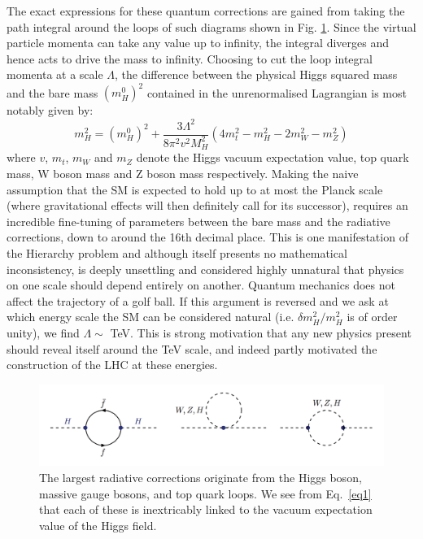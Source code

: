 \documentclass[a4paper]{jpconf}
\begin{document}
\hfill\break
\noindent The exact expressions for these quantum corrections are gained from taking the path integral around the loops of such diagrams shown in Fig. \ref{fig:feyn}. Since the virtual particle momenta can take any value up to infinity, the integral diverges and hence acts to drive the mass to infinity. Choosing to cut the loop integral momenta at a scale \(\Lambda\), the difference between the physical Higgs squared mass and the bare mass \(\left(m_{H}^0\right)^2\) contained in the unrenormalised Lagrangian is most notably given by\cite{djouadi}:
\begin{equation}
\label{eq1}
m_H^2 = \left(m_{H}^0\right)^2  + \frac{3\Lambda^2}{8\pi^2 v^2 M_H^2}\left(4m_t^2 - m_H^2 - 2m_W^2 - m_Z^2\right)
\end{equation}
where \(v\), \(m_t\), \(m_W\) and \(m_Z\) denote the Higgs vacuum expectation value, top quark mass, W boson mass and Z boson mass respectively. Making the naive assumption that the SM is expected to hold up to at most the Planck scale (where gravitational effects will then definitely call for its successor), requires an incredible fine-tuning of parameters between the bare mass and the radiative corrections, down to around the 16th decimal place. This is one manifestation of the Hierarchy problem and although itself presents no mathematical inconsistency, is deeply unsettling and considered highly unnatural that physics on one scale should depend entirely on another. Quantum mechanics does not affect the trajectory of a golf ball. If this argument is reversed and we ask at which energy scale the SM can be considered natural (i.e. \(\delta m_H^2/m_H^2\) is of order unity), we find \(\Lambda \sim\) TeV. This is strong motivation that any new physics present should reveal itself around the TeV scale, and indeed partly motivated the construction of the LHC at these energies.

\begin{figure}[h]
	\centering
	\includegraphics[width=12cm]{feynman} 
	\caption{The largest radiative corrections originate from the Higgs boson, massive gauge bosons, and top quark loops. We see from Eq.~\eqref{eq1} that each of these is inextricably linked to the vacuum expectation value of the Higgs field.}
	\label{fig:feyn}
\end{figure}
\end{document}
